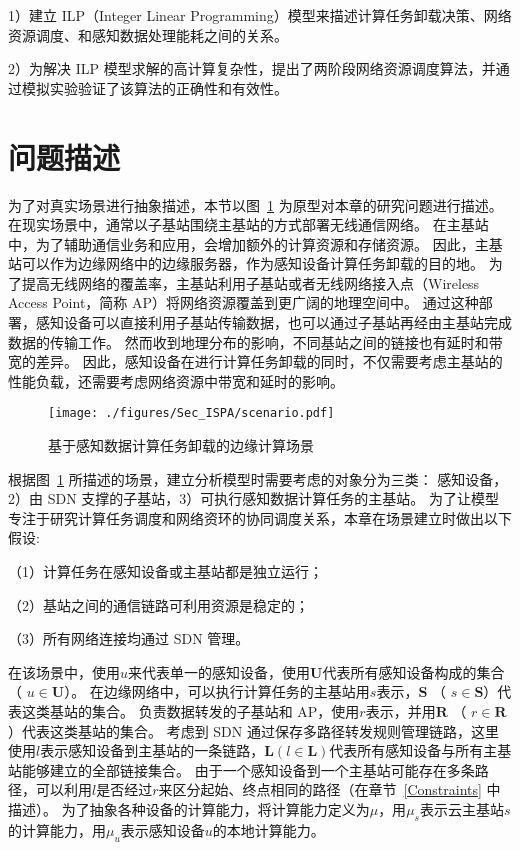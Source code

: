 1）建立 ILP（Integer Linear Programming）模型来描述计算任务卸载决策、网络资源调度、和感知数据处理能耗之间的关系。

2）为解决 ILP 模型求解的高计算复杂性，提出了两阶段网络资源调度算法，并通过模拟实验验证了该算法的正确性和有效性。

\section{问题描述}

为了对真实场景进行抽象描述，本节以图~\ref{fig_scenario} 为原型对本章的研究问题进行描述。
在现实场景中，通常以子基站围绕主基站的方式部署无线通信网络。
在主基站中，为了辅助通信业务和应用，会增加额外的计算资源和存储资源。
因此，主基站可以作为边缘网络中的边缘服务器，作为感知设备计算任务卸载的目的地。
为了提高无线网络的覆盖率，主基站利用子基站或者无线网络接入点（Wireless Access Point，简称 AP）将网络资源覆盖到更广阔的地理空间中。
通过这种部署，感知设备可以直接利用子基站传输数据，也可以通过子基站再经由主基站完成数据的传输工作。
然而收到地理分布的影响，不同基站之间的链接也有延时和带宽的差异。
因此，感知设备在进行计算任务卸载的同时，不仅需要考虑主基站的性能负载，还需要考虑网络资源中带宽和延时的影响。

\begin{figure}[!h]
  \centering
  \texttt{[image: ./figures/Sec\_ISPA/scenario.pdf]}
  \vspace{-1em}
  \caption{基于感知数据计算任务卸载的边缘计算场景}
  \label{fig_scenario}
\end{figure}

根据图~\ref{fig_scenario} 所描述的场景，建立分析模型时需要考虑的对象分为三类：
感知设备，2）由 SDN 支撑的子基站，3）可执行感知数据计算任务的主基站。
为了让模型专注于研究计算任务调度和网络资环的协同调度关系，本章在场景建立时做出以下假设: 

（1）计算任务在感知设备或主基站都是独立运行；

（2）基站之间的通信链路可利用资源是稳定的；

（3）所有网络连接均通过 SDN 管理。



在该场景中，使用$u$来代表单一的感知设备，使用$\boldsymbol{U}$代表所有感知设备构成的集合（ $ u \in \boldsymbol{U} $）。
在边缘网络中，可以执行计算任务的主基站用$s$表示，$\boldsymbol{S}$ （ $ s \in \boldsymbol{S} $）代表这类基站的集合。
负责数据转发的子基站和 AP，使用$r$表示，并用$\boldsymbol{R}$ （ $ r \in \boldsymbol{R} $）代表这类基站的集合。
考虑到 SDN 通过保存多路径转发规则管理链路，这里使用$l$表示感知设备到主基站的一条链路，$ \boldsymbol{L} ( l \in \boldsymbol{L} ) $代表所有感知设备与所有主基站能够建立的全部链接集合。
由于一个感知设备到一个主基站可能存在多条路径，可以利用$l$是否经过$r$来区分起始、终点相同的路径（在章节~\ref{Constraints} 中描述）。
为了抽象各种设备的计算能力，将计算能力定义为$\mu$，用$\mu_s$表示云主基站$s$的计算能力，用$\mu_u$表示感知设备$u$的本地计算能力。

